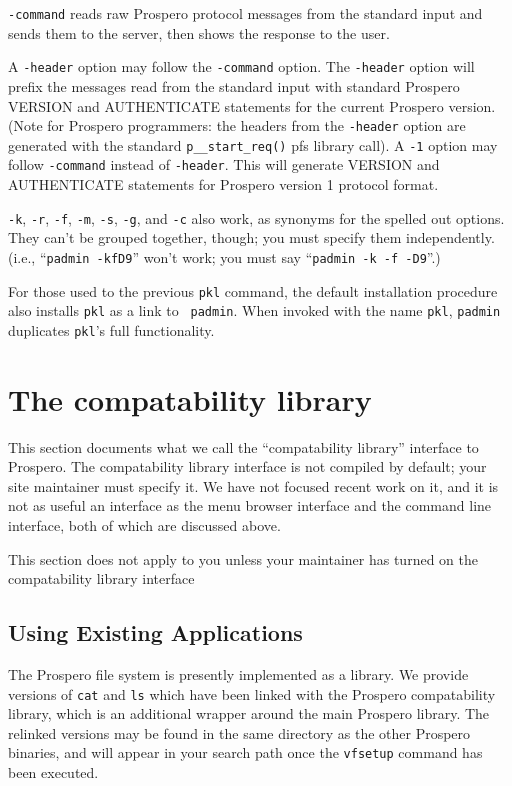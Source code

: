 {\tt -command} reads raw Prospero protocol messages from the standard input
and sends them to the server, then shows the response to the user.

A {\tt -header} option may follow the {\tt -command} option.  The {\tt -header} option
will prefix the messages read from the standard input with standard
Prospero VERSION and AUTHENTICATE statements for the current Prospero
version.  (Note for Prospero programmers: the headers from the {\tt -header}
option are generated with the standard {\tt p\_\_start\_req()} pfs library
call).  A {\tt -1} option may follow {\tt -command} instead of {\tt -header}.  This will
generate VERSION and AUTHENTICATE statements for Prospero version 1
protocol format.

{\tt -k}, {\tt -r}, {\tt -f}, {\tt -m}, {\tt -s}, {\tt -g}, and {\tt -c} also work, as synonyms for the spelled
out options.  They can't be grouped together, though; you must specify
them independently.  (i.e., ``{\tt padmin -kfD9}'' won't work; you must say
``{\tt padmin -k -f -D9}''.)

For those used to the previous {\tt pkl} command, the default
installation procedure also installs {\tt pkl} as a link to {\tt
padmin}.  When invoked with the name {\tt pkl}, {\tt padmin}
duplicates {\tt pkl}'s full functionality.

\section{The compatability library}

This section documents what we call the ``compatability library''
interface to Prospero.  The compatability library interface is not
compiled by default; your site maintainer must specify it.  We have
not focused recent work on it, and it is not as useful an interface as
the menu browser interface and the command line interface, both of
which are discussed above.

This section does not apply to you unless your maintainer has turned
on the compatability library interface

\subsection{Using Existing Applications\label{exist_app}}

The Prospero file system is presently implemented as a library.  We
provide versions of {\tt cat} and {\tt ls} which have been linked with
the Prospero compatability library, which is an additional wrapper
around the main Prospero library.  The relinked versions may be found
in the same directory as the other Prospero binaries, and will appear
in your search path once the {\tt vfsetup} command has been executed.

